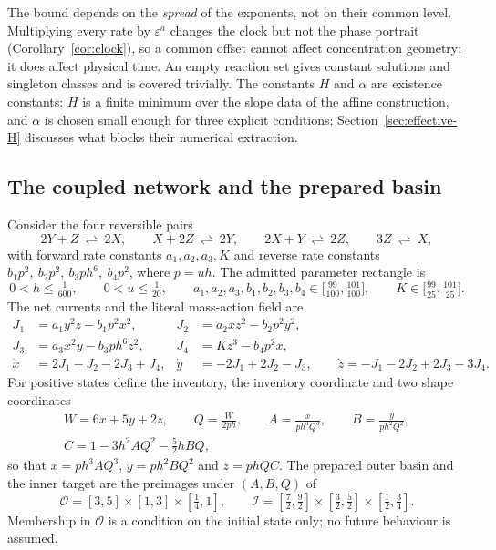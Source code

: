 \documentclass[11pt,a4paper]{article}
\theoremstyle{plain}
\theoremstyle{definition}
\theoremstyle{remark}
\newcommand{\eps}{\varepsilon}
\newcommand{\calO}{\mathcal O}
\newcommand{\calI}{\mathcal I}
\begin{document}
The bound depends on the \emph{spread} of the exponents, not on their common level. Multiplying every rate by $\eps^{a}$ changes the clock but not the phase portrait (Corollary~\ref{cor:clock}), so a common offset cannot affect concentration geometry; it does affect physical time. An empty reaction set gives constant solutions and singleton classes and is covered trivially. The constants $H$ and $\alpha$ are existence constants: $H$ is a finite minimum over the slope data of the affine construction, and $\alpha$ is chosen small enough for three explicit conditions; Section~\ref{sec:effective-H} discusses what blocks their numerical extraction.

\subsection{The coupled network and the prepared basin}
Consider the four reversible pairs
\begin{equation}\label{eq:reactions}
 2Y+Z\ \rightleftharpoons\ 2X,\qquad X+2Z\ \rightleftharpoons\ 2Y,\qquad 2X+Y\ \rightleftharpoons\ 2Z,\qquad 3Z\ \rightleftharpoons\ X,
\end{equation}
with forward rate constants $a_1,a_2,a_3,K$ and reverse rate constants $b_1p^2,\ b_2p^2,\ b_3ph^6,\ b_4p^2$, where $p=uh$. The admitted parameter rectangle is
\begin{equation}\label{eq:parameters}
 0<h\le\tfrac1{600},\qquad 0<u\le\tfrac1{20},\qquad a_1,a_2,a_3,b_1,b_2,b_3,b_4\in\big[\tfrac{99}{100},\tfrac{101}{100}\big],\qquad K\in\big[\tfrac{99}{25},\tfrac{101}{25}\big].
\end{equation}
The net currents and the literal mass-action field are
\begin{equation}\label{eq:currents}
\begin{aligned}
 J_1&=a_1y^2z-b_1p^2x^2, & J_2&=a_2xz^2-b_2p^2y^2,\\
 J_3&=a_3x^2y-b_3ph^6z^2, & J_4&=Kz^3-b_4p^2x,\\
 \dot x&=2J_1-J_2-2J_3+J_4, & \dot y&=-2J_1+2J_2-J_3,\qquad \dot z=-J_1-2J_2+2J_3-3J_4.
\end{aligned}
\end{equation}
For positive states define the inventory, the inventory coordinate and two shape coordinates
\begin{equation}\label{eq:coordinates}
\begin{gathered}
 W=6x+5y+2z,\qquad Q=\frac{W}{2ph},\qquad A=\frac{x}{ph^3Q^3},\qquad B=\frac{y}{ph^2Q^2},\\
 C=1-3h^2AQ^2-\tfrac52hBQ,
\end{gathered}
\end{equation}
so that $x=ph^3AQ^3$, $y=ph^2BQ^2$ and $z=phQC$. The prepared outer basin and the inner target are the preimages under $(A,B,Q)$ of
\begin{equation}\label{eq:regions}
 \calO=[3,5]\times[1,3]\times[\tfrac14,1],\qquad \calI=[\tfrac72,\tfrac92]\times[\tfrac32,\tfrac52]\times[\tfrac12,\tfrac34].
\end{equation}
Membership in $\calO$ is a condition on the initial state only; no future behaviour is assumed.
\end{document}
